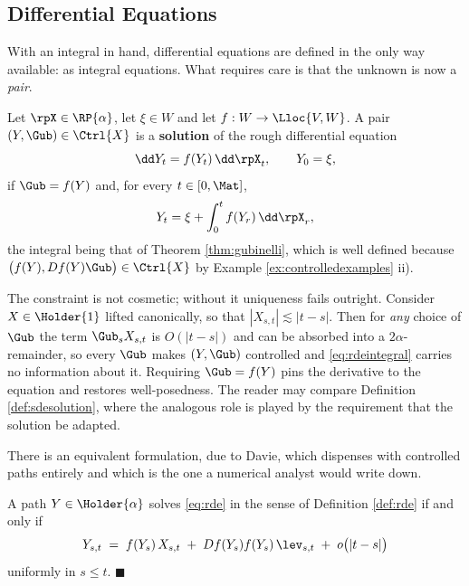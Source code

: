 \subsection{Differential Equations}\label{subsec:rdes}

With an integral in hand, differential equations are defined in the only way available: as integral
equations. What requires care is that the unknown is now a \emph{pair}.

\begin{definition}\label{def:rde}
Let $\rpX \in \RP{\alpha}$, let $\xi \in W$ and let $f : W \to \Lloc{V,W}$. A pair
$(Y,\Gub) \in \Ctrl{X}$ is a \textbf{solution} of the rough differential equation
\begin{equation}\label{eq:rde}
\dd Y_t = f(Y_t)\,\dd\rpX_t, \qquad Y_0 = \xi,
\end{equation}
if $\Gub = f(Y)$ and, for every $t \in [0,\Mat]$,
\begin{equation}\label{eq:rdeintegral}
Y_t = \xi + \int_0^t f(Y_r)\,\dd\rpX_r ,
\end{equation}
the integral being that of Theorem \ref{thm:gubinelli}, which is well defined because
$\bigl(f(Y), Df(Y)\Gub\bigr) \in \Ctrl{X}$ by Example \ref{ex:controlledexamples} ii).
\end{definition}

\begin{remark}[Why $\Gub = f(Y)$ is imposed]\label{rem:whygubisf}
The constraint is not cosmetic; without it uniqueness fails outright. Consider $X\in\Holder{1}$
lifted canonically, so that $|X_{s,t}| \lesssim |t-s|$. Then for \emph{any} choice of $\Gub$ the
term $\Gub_s X_{s,t}$ is $O(|t-s|)$ and can be absorbed into a $2\alpha$-remainder, so every $\Gub$
makes $(Y,\Gub)$ controlled and \eqref{eq:rdeintegral} carries no information about it. Requiring
$\Gub = f(Y)$ pins the derivative to the equation and restores well-posedness. The reader may
compare Definition \ref{def:sdesolution}, where the analogous role is played by the requirement
that the solution be adapted.
\end{remark}

There is an equivalent formulation, due to Davie, which dispenses with controlled paths entirely
and which is the one a numerical analyst would write down.

\begin{proposition}\label{prop:davie}
A path $Y \in \Holder{\alpha}$ solves \eqref{eq:rde} in the sense of Definition \ref{def:rde} if and
only if
\begin{equation}\label{eq:davie}
Y_{s,t} \;=\; f(Y_s)\,X_{s,t} \;+\; Df(Y_s)f(Y_s)\,\lev_{s,t} \;+\; o\bigl(|t-s|\bigr)
\end{equation}
uniformly in $s\leq t$. \hfill $\blacksquare$
\end{proposition}

